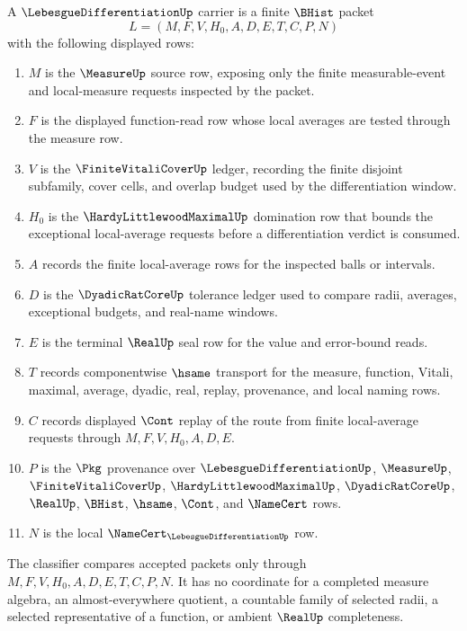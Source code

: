 \begin{definition}
\label{def:lebesgue-differentiation-carrier}
A $\LebesgueDifferentiationUp$ carrier is a finite $\BHist$ packet
$$
L=(M,F,V,H_0,A,D,E,T,C,P,N)
$$
with the following displayed rows:
\begin{enumerate}
\item $M$ is the $\MeasureUp$ source row, exposing only the finite measurable-event and local-measure requests inspected by the packet.
\item $F$ is the displayed function-read row whose local averages are tested through the measure row.
\item $V$ is the $\FiniteVitaliCoverUp$ ledger, recording the finite disjoint subfamily, cover cells, and overlap budget used by the differentiation window.
\item $H_0$ is the $\HardyLittlewoodMaximalUp$ domination row that bounds the exceptional local-average requests before a differentiation verdict is consumed.
\item $A$ records the finite local-average rows for the inspected balls or intervals.
\item $D$ is the $\DyadicRatCoreUp$ tolerance ledger used to compare radii, averages, exceptional budgets, and real-name windows.
\item $E$ is the terminal $\RealUp$ seal row for the value and error-bound reads.
\item $T$ records componentwise $\hsame$ transport for the measure, function, Vitali, maximal, average, dyadic, real, replay, provenance, and local naming rows.
\item $C$ records displayed $\Cont$ replay of the route from finite local-average requests through $M,F,V,H_0,A,D,E$.
\item $P$ is the $\Pkg$ provenance over $\LebesgueDifferentiationUp$, $\MeasureUp$, $\FiniteVitaliCoverUp$, $\HardyLittlewoodMaximalUp$, $\DyadicRatCoreUp$, $\RealUp$, $\BHist$, $\hsame$, $\Cont$, and $\NameCert$ rows.
\item $N$ is the local $\NameCert_{\LebesgueDifferentiationUp}$ row.
\end{enumerate}
The classifier compares accepted packets only through $M,F,V,H_0,A,D,E,T,C,P,N$. It has no coordinate for a completed measure algebra, an almost-everywhere quotient, a countable family of selected radii, a selected representative of a function, or ambient $\RealUp$ completeness.
\end{definition}

